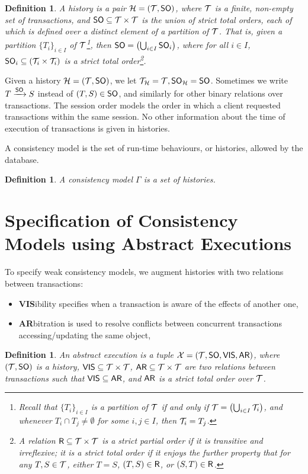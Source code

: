 \documentclass[a4paper,UKenglish]{article}%
\newtheorem{definition}[theorem]{Definition}
\theoremstyle{plain}
\begin{document}
\begin{definition}
A \emph{history} is a pair $\mathcal{H} = (\mathcal{T}, {\sf{SO}})$, where $\mathcal{T}$ is a finite, non-empty 
set of transactions, and ${\sf{SO}} \subseteq \mathcal{T} \times \mathcal{T}$ is the union of strict total orders, each of which 
is defined over a distinct element of a partition of $\mathcal{T}$. That is, given a partition $\{T_i\}_{i \in I}$ 
of $\mathcal{T}$\footnote{Recall that $\{T_i\}_{i \in I}$ is a partition of $\mathcal{T}$ if and only if 
$\mathcal{T} = \left( \bigcup_{i \in I} \mathcal{T}_i \right)$, and whenever 
$T_i \cap T_j \neq \emptyset$ for some $i, j \in I$, then $\mathcal{T}_i = T_j$.}, 
then ${\sf{SO}} = \left( \bigcup_{i \in I} {\sf{SO}}_i \right)$, where for all $i \in I$, 
${\sf{SO}}_i \subseteq (\mathcal{T}_i \times \mathcal{T}_i)$ is a strict total order\footnote{A relation $\mathsf{R} \subseteq \mathcal{T} \times \mathcal{T}$ is a strict partial order 
if it is transitive and irreflexive; it is a strict total order if it enjoys the further property that for 
any $T, S \in \mathcal{T}$, either $T = S$, $(T,S) \in \mathsf{R}$, or $(S,T) \in \mathsf{R}$.}.
\end{definition}
Given a history $\mathcal{H} = (\mathcal{T}, {\sf{SO}})$, we let $\mathcal{T}_{\mathcal{H}} = \mathcal{T}, {\sf{SO}}_{\mathcal{H}} = {\sf{SO}}$. 
Sometimes we write $T \xrightarrow{{\sf{SO}}} S$ instead of $(T,S) \in {\sf{SO}}$, 
and similarly for other binary relations over transactions.
The session order models the order in which a client requested transactions 
within the same session. No other information about the time of execution 
of transactions is given in histories. 

A consistency model is the set of run-time behaviours, or histories, 
allowed by the database.
\begin{definition}
A consistency model $\Gamma$ is a set of histories.
\end{definition}

\section{Specification of Consistency Models using Abstract Executions}
To specify weak consistency models, we augment histories with two 
relations between transactions: 
\begin{itemize}
\item \textbf{VIS}ibility specifies when a transaction is aware of the effects 
of another one, 
\item \textbf{AR}bitration is used to resolve conflicts between concurrent 
transactions accessing/updating the same object,
\end{itemize} 

\begin{definition}
An abstract execution is a tuple $\mathcal{X} = (\mathcal{T}, {\sf{SO}}, {\mathsf{VIS}}, {\sf{AR}})$, 
where $(\mathcal{T}, {\sf{SO}})$ is a history, ${\mathsf{VIS}} \subseteq \mathcal{T} \times \mathcal{T}$, ${\sf{AR}} \subseteq \mathcal{T} \times \mathcal{T}$ 
are two relations between transactions such that ${\mathsf{VIS}} \subseteq {\sf{AR}}$, and ${\sf{AR}}$ 
is a strict total order over $\mathcal{T}$. 
\end{definition}
\end{document}
